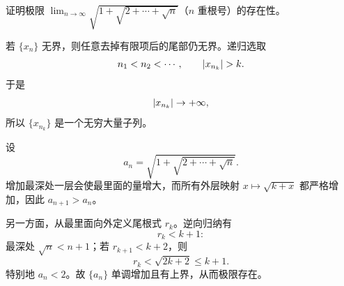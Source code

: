 \begin{xexercise}[5]
证明极限 $\displaystyle\lim_{n\to\infty}\sqrt{1+\sqrt{2+\cdots+\sqrt n}}$（$n$ 重根号）的存在性。
\end{xexercise}
\begin{xsolution}
若 $\{x_n\}$ 无界，则任意去掉有限项后的尾部仍无界。递归选取
\[
  n_1<n_2<\cdots,
  \qquad
  \lvert x_{n_k}\rvert>k.
\]
于是
\[
  \lvert x_{n_k}\rvert\to+\infty,
\]
所以 $\{x_{n_k}\}$ 是一个无穷大量子列。

设
\[
  a_n=\sqrt{1+\sqrt{2+\cdots+\sqrt n}}.
\]
增加最深处一层会使最里面的量增大，而所有外层映射 $x\mapsto\sqrt{k+x}$ 都严格增加，因此 $a_{n+1}>a_n$。

另一方面，从最里面向外定义尾根式 $r_k$。逆向归纳有
\[
  r_k<k+1:
\]
最深处 $\sqrt n<n+1$；若 $r_{k+1}<k+2$，则
\[
  r_k<\sqrt{2k+2}\le k+1.
\]
特别地 $a_n<2$。故 $\{a_n\}$ 单调增加且有上界，从而极限存在。
\end{xsolution}


